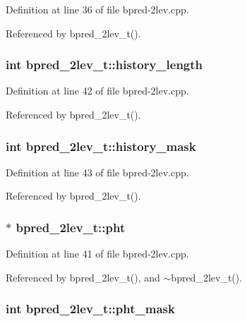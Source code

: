 Definition at line 36 of file bpred-2lev.cpp.

Referenced by bpred\_\-2lev\_\-t().
\subsubsection[{history\_\-length}]{\setlength{\rightskip}{0pt plus 5cm}int {\bf bpred\_\-2lev\_\-t::history\_\-length}\hspace{0.3cm}{\tt  [protected]}}\label{classbpred__2lev__t_0866635a5cada7f43caacd1ee7d381db}




Definition at line 42 of file bpred-2lev.cpp.

Referenced by bpred\_\-2lev\_\-t().
\subsubsection[{history\_\-mask}]{\setlength{\rightskip}{0pt plus 5cm}int {\bf bpred\_\-2lev\_\-t::history\_\-mask}\hspace{0.3cm}{\tt  [protected]}}\label{classbpred__2lev__t_404b1fd66a56769144ebe6033327bfea}




Definition at line 43 of file bpred-2lev.cpp.

Referenced by bpred\_\-2lev\_\-t().
\subsubsection[{pht}]{$\ast$ {\bf bpred\_\-2lev\_\-t::pht}\hspace{0.3cm}{\tt  [protected]}}\label{classbpred__2lev__t_177b757a4955ba16f905cb67da5167a4}




Definition at line 41 of file bpred-2lev.cpp.

Referenced by bpred\_\-2lev\_\-t(), and $\sim$bpred\_\-2lev\_\-t().
\subsubsection[{pht\_\-mask}]{\setlength{\rightskip}{0pt plus 5cm}int {\bf bpred\_\-2lev\_\-t::pht\_\-mask}\hspace{0.3cm}{\tt  [protected]}}\label{classbpred__2lev__t_53a1c21c1cbdc89f885969bc0a6740cd}




